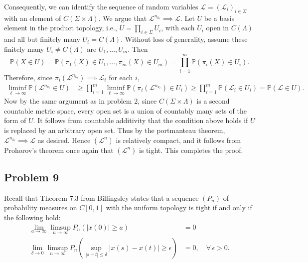 \documentclass[12pt]{article}
\begin{document}
		Consequently, we can identify the sequence of random variables $\mathcal{L} = (\mathcal{L}_i)_{i\in\Sigma}$ with an element of $C(\Sigma\times\Lambda)$. We argue that $\mathcal{L}^{n_{k_\ell}}\implies \mathcal{L}$. Let $U$ be a basis element in the product topology, i.e., $U = \prod_{i\in\Sigma} U_i$, with each $U_i$ open in $C(\Lambda)$ and all but finitely many $U_i = C(\Lambda)$. Without loss of generality, assume these finitely many $U_i\neq C(\Lambda)$ are $U_1,\dots,U_m$. Then
		\[
		\mathbb{P}(X \in U) = \mathbb{P}(\pi_1(X) \in U_1, \dots, \pi_m(X) \in U_m) = \prod_{i=1}^m \mathbb{P}(\pi_i(X)\in U_i).
		\]
		Therefore, since $\pi_i(\mathcal{L}^{n_{k_\ell}}) \implies \mathcal{L}_i$ for each $i$,
		\begin{align*}
		\liminf_{\ell\to\infty} \mathbb{P}(\mathcal{L}^{n_{k_\ell}} \in U) &\geq \prod_{i=1}^m \liminf_{\ell\to\infty} \mathbb{P}(\pi_i(\mathcal{L}^{n_{k_\ell}})\in U_i) \geq \prod_{i=1}^m \mathbb{P}(\mathcal{L}_i \in U_i) = \mathbb{P}(\mathcal{L}\in U).
		\end{align*}
		Now by the same argument as in problem 2, since $C(\Sigma\times\Lambda)$ is a second countable metric space, every open set is a union of countably many sets of the form of $U$. It follows from countable additivity that the condition above holds if $U$ is replaced by an arbitrary open set. Thus by the portmanteau theorem, $\mathcal{L}^{n_{k_\ell}} \implies \mathcal{L}$ as desired. Hence $(\mathcal{L}^n)$ is relatively compact, and it follows from Prohorov's theorem  once again that $(\mathcal{L}^n)$ is tight. This completes the proof.
		
	
	\subsection*{Problem 9}
	
		Recall that Theorem 7.3 from Billingsley states that a sequence $(P_n)$ of probability measures on $C[0,1]$ with the uniform topology is tight if and only if the following hold:
		\begin{align}
			\lim_{a\to\infty} \limsup_{n\to\infty} P_n(|x(0)|\geq a) &= 0 \\
			\lim_{\delta\to 0} \limsup_{n\to\infty} P_n\left(\sup_{|s-t|\leq\delta} |x(s)-x(t)| \geq \epsilon\right) &= 0, \quad \forall\,\epsilon>0.
		\end{align}
		
\end{document}
